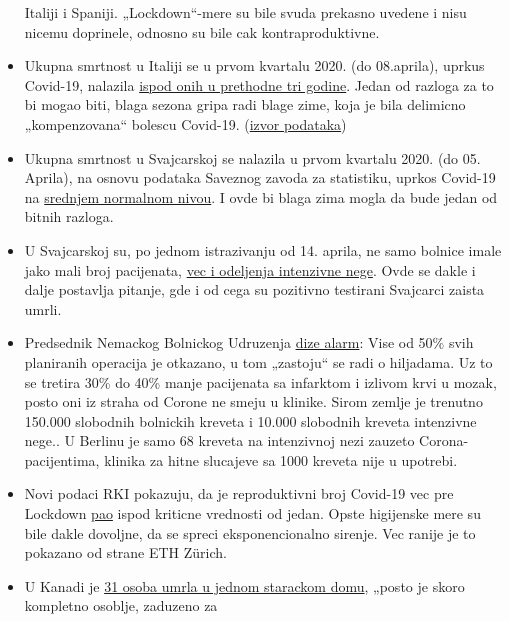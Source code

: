 \begin{itemize}
  Italiji i Spaniji. „Lockdown``-mere su bile svuda prekasno uvedene i
  nisu nicemu doprinele, odnosno su bile cak kontraproduktivne.
\item
  Ukupna smrtnost u Italiji se u prvom kvartalu 2020. (do 08.aprila),
  uprkus Covid-19, nalazila
  \href{https://latina.biz/confronto-decessi-italia-1-trimestre-2019-e-2020-con-covid19/}{ispod
  onih u prethodne tri godine}. Jedan od razloga za to bi mogao biti,
  blaga sezona gripa radi blage zime, koja je bila delimicno
  „kompenzovana`` bolescu Covid-19.
  (\href{http://demo.istat.it/bilmens2019gen/index.html}{izvor
  podataka})
\item
  Ukupna smrtnost u Svajcarskoj se nalazila u prvom kvartalu 2020. (do
  05. Aprila), na osnovu podataka Saveznog zavoda za statistiku, uprkos
  Covid-19 na
  \href{http://demo.istat.it/bilmens2019gen/index.html}{srednjem
  normalnom nivou}. I ovde bi blaga zima mogla da bude jedan od bitnih
  razloga.
\item
  U Svajcarskoj su, po jednom istrazivanju od 14. aprila, ne samo
  bolnice imale jako mali broj pacijenata,
  \href{https://swprs.files.wordpress.com/2020/03/42ad8-intensivbettenbelegung2bschweiz2b-2b14-4-20202bpdf.png}{vec
  i odeljenja intenzivne nege}. Ovde se dakle i dalje postavlja pitanje,
  gde i od cega su pozitivno testirani Svajcarci zaista umrli.
\item
  Predsednik Nemackog Bolnickog Udruzenja
  \href{https://www.bz-berlin.de/deutschland/kliniken-verband-schlaegt-alarm-wegen-corona-regeln}{dize
  alarm}: Vise od 50\% svih planiranih operacija je otkazano, u tom
  „zastoju`` se radi o hiljadama. Uz to se tretira 30\% do 40\% manje
  pacijenata sa infarktom i izlivom krvi u mozak, posto oni iz straha od
  Corone ne smeju u klinike. Sirom zemlje je trenutno 150.000 slobodnih
  bolnickih kreveta i 10.000 slobodnih kreveta intenzivne nege.. U
  Berlinu je samo 68 kreveta na intenzivnoj nezi zauzeto
  Corona-pacijentima, klinika za hitne slucajeve sa 1000 kreveta nije u
  upotrebi.
\item
  Novi podaci RKI pokazuju, da je reproduktivni broj Covid-19 vec pre
  Lockdown
  \href{https://www.rki.de/DE/Content/Infekt/EpidBull/Archiv/2020/Ausgaben/17_20_SARS-CoV2_vorab.pdf}{pao}
  ispod kriticne vrednosti od jedan. Opste higijenske mere su bile dakle
  dovoljne, da se spreci eksponencionalno sirenje. Vec ranije je to
  pokazano od strane ETH Zürich.
\item
  U Kanadi je \href{https://orf.at/stories/3162365/}{31 osoba umrla u
  jednom starackom domu}, „posto je skoro kompletno osoblje, zaduzeno za

\end{itemize}
